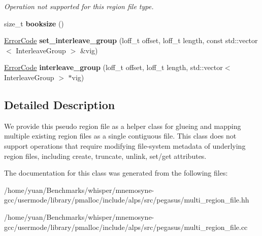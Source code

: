 \begin{DoxyCompactItemize}
\begin{DoxyCompactList}\small\item\em Operation not supported for this region file type. \end{DoxyCompactList}\item 
size\+\_\+t {\bfseries booksize} ()\hypertarget{classalps_1_1MultiRegionFile_a4140e32344954ef79c2dce39bf942a7d}{}\label{classalps_1_1MultiRegionFile_a4140e32344954ef79c2dce39bf942a7d}

\item 
\hyperlink{group__ERRORCODES_ga6263a3c9a0b8d36aea21cdd835ac99fe}{Error\+Code} {\bfseries set\+\_\+interleave\+\_\+group} (loff\+\_\+t offset, loff\+\_\+t length, const std\+::vector$<$ Interleave\+Group $>$ \&vig)\hypertarget{classalps_1_1MultiRegionFile_aa5d9db02bcb0450caf1df87fc45a09f7}{}\label{classalps_1_1MultiRegionFile_aa5d9db02bcb0450caf1df87fc45a09f7}

\item 
\hyperlink{group__ERRORCODES_ga6263a3c9a0b8d36aea21cdd835ac99fe}{Error\+Code} {\bfseries interleave\+\_\+group} (loff\+\_\+t offset, loff\+\_\+t length, std\+::vector$<$ Interleave\+Group $>$ $\ast$vig)\hypertarget{classalps_1_1MultiRegionFile_a9cbdd991f99da438edaf5c697f282f47}{}\label{classalps_1_1MultiRegionFile_a9cbdd991f99da438edaf5c697f282f47}

\end{DoxyCompactItemize}


\subsection{Detailed Description}
We provide this pseudo region file as a helper class for glueing and mapping multiple existing region files as a single contiguous file. This class does not support operations that require modifying file-\/system metadata of underlying region files, including create, truncate, unlink, set/get attributes. 

The documentation for this class was generated from the following files\+:\begin{DoxyCompactItemize}
\item 
/home/yuan/\+Benchmarks/whisper/mnemosyne-\/gcc/usermode/library/pmalloc/include/alps/src/pegasus/multi\+\_\+region\+\_\+file.\+hh\item 
/home/yuan/\+Benchmarks/whisper/mnemosyne-\/gcc/usermode/library/pmalloc/include/alps/src/pegasus/multi\+\_\+region\+\_\+file.\+cc\end{DoxyCompactItemize}
